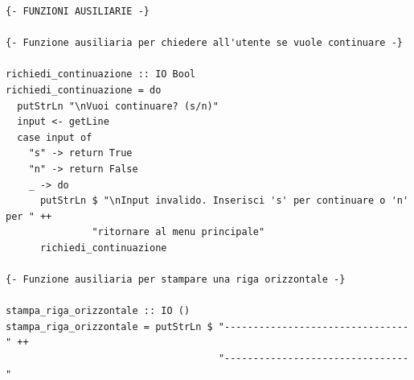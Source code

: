 \documentclass[11pt]{article}
\theoremstyle{definition}
\begin{document}
\begin{verbatim}
{- FUNZIONI AUSILIARIE -}

{- Funzione ausiliaria per chiedere all'utente se vuole continuare -}

richiedi_continuazione :: IO Bool
richiedi_continuazione = do
  putStrLn "\nVuoi continuare? (s/n)"
  input <- getLine
  case input of
    "s" -> return True
    "n" -> return False
    _ -> do
      putStrLn $ "\nInput invalido. Inserisci 's' per continuare o 'n' per " ++ 
               "ritornare al menu principale"
      richiedi_continuazione

{- Funzione ausiliaria per stampare una riga orizzontale -}

stampa_riga_orizzontale :: IO ()
stampa_riga_orizzontale = putStrLn $ "--------------------------------" ++ 
                                     "--------------------------------"
\end{verbatim}

\newpage
\end{document}
